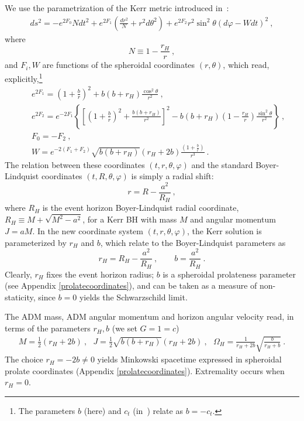 We use the parametrization of the Kerr metric  introduced in~\cite{Herdeiro:2015gia}: 
\begin{eqnarray}
 ds^2=-e^{2F_0}N dt^2+e^{2F_1}\left(\frac{dr^2}{N}+r^2 d\theta^2\right) + e^{2F_2}r^2 \sin^2\theta \left(d\varphi-W dt\right)^2 \ ,
 \label{kerrnc}
\end{eqnarray}
%
%
where 
\begin{equation}
N\equiv 1 -\frac{r_H}{r} \ ,
\label{n}
\end{equation} 
and  $F_i,W$ are functions of the spheroidal coordinates $(r,\theta)$, which read, explicitly,\footnote{The parameters $b$ (here) and $c_t$ (in~\cite{Herdeiro:2015gia}) relate as $b=-c_t$.}
%
\begin{eqnarray}
\nonumber
&&
e^{2F_1}=\left(1+\frac{b}{r}\right)^2+b(b+r_H)\frac{\cos^2\theta}{r^2}\ ,
\\
\nonumber
&&
e^{2F_2}=e^{-2F_1}
\left\{
          \left[
\left(1+\frac{b}{r}\right)^2+\frac{b(b+r_H)}{r^2}
          \right]^2-b(b+r_H)\left(1-\frac{r_H}{r}\right)\frac{\sin^2\theta}{r^2}
\right\}\ ,
\\
\nonumber
&&
F_0=-F_2 \ , \\
&&
\label{functionsKerr}
\displaystyle{W=e^{-2(F_1+F_2)}
\sqrt{b(b+r_H)}(r_H+2b)
\frac{(1+\frac{b}{r})}{r^3}} \ .
\end{eqnarray}
The relation between these coordinates $(t,r,\theta,\varphi)$ and the standard Boyer-Lindquist coordinates $(t,R,\theta,\varphi)$ is simply a radial shift:
\begin{equation}
r=R-\frac{a^2}{R_H} \ , 
\end{equation}
where $R_H$ is the event horizon Boyer-Lindquist radial coordinate,  $R_H\equiv M+\sqrt{M^2-a^2}$, for a Kerr BH with mass $M$ and angular momentum $J=aM$. In the new coordinate system $(t,r,\theta,\varphi)$, the Kerr solution is parameterized by $r_H$ and $b$, which relate to the Boyer-Lindquist parameters as
\begin{equation}
r_H=R_H-\frac{a^2}{R_H} \ , \qquad b=\frac{a^2}{R_H} \ .
\end{equation}
Clearly, $r_H$ fixes the event horizon radius; $b$ is a spheroidal prolateness parameter (see Appendix \ref{prolatecoordinates}), and can be taken as a measure of non-staticity, since $b=0$ yields the Schwarzschild limit.

The ADM mass, ADM angular momentum and horizon angular velocity read, in terms of the parameters $r_H,b$ (we set $G=1=c$)
\begin{equation}
\begin{array}{c}
M=\frac{1}{2}(r_H+2b) \ , \ \ \ 
J=\frac{1}{2}\sqrt{b(b+r_H)}(r_H+2b) \ , \ \ \
\label{Kerr2}
\displaystyle{\Omega_H=\frac{1}{r_H+2b}\sqrt{\frac{b}{r_H+b}}} \ .
\end{array}
\end{equation}
The choice $r_H=-2b\neq 0$
yields Minkowski spacetime expressed in spheroidal prolate coordinates (Appendix \ref{prolatecoordinates}). Extremality occurs when $r_H=0$.



